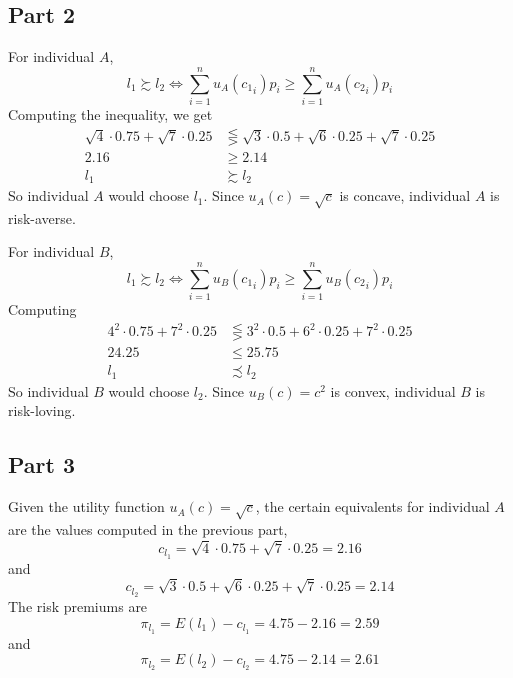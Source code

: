 \documentclass[12pt]{extarticle}
\numberwithin{table}{section}
\numberwithin{figure}{section}
\numberwithin{equation}{section}
\begin{document}
\subsection*{Part 2}
For individual $A$,
\begin{equation}
    l_1 \succsim l_2 \iff \sum_{i = 1}^n u_A({c_1}_i) p_i \ge \sum_{i = 1}^n u_A({c_2}_i) p_i
\end{equation}
Computing the inequality, we get
\begin{align}
    \sqrt{4} \cdot 0.75 + \sqrt7 \cdot 0.25 & \lesseqgtr \sqrt3 \cdot 0.5 + \sqrt6 \cdot 0.25 + \sqrt7 \cdot 0.25 \\
    2.16                                    & \ge 2.14                                                            \\
    l_1                                     & \succsim l_2
\end{align}
So individual $A$ would choose $l_1$. Since $u_A(c) = \sqrt c$ is concave, individual $A$ is risk-averse.

For individual $B$,
\begin{equation}
    l_1 \succsim l_2 \iff \sum_{i = 1}^n u_B({c_1}_i)p_i \ge \sum_{i = 1}^n u_B({c_2}_i) p_i
\end{equation}
Computing
\begin{align}
    4^2 \cdot 0.75 + 7^2 \cdot 0.25 & \lesseqgtr 3^2 \cdot 0.5 + 6^2 \cdot 0.25 + 7^2 \cdot 0.25 \\
    24.25                           & \le 25.75                                                  \\
    l_1                             & \precsim l_2
\end{align}
So individual $B$ would choose $l_2$. Since $u_B(c) = c^2$ is convex, individual $B$ is risk-loving.

\subsection*{Part 3}
Given the utility function $u_A(c) = \sqrt c$,
the certain equivalents for individual $A$ are the values computed in the previous part,
\begin{equation}
    c_{l_1} = \sqrt4 \cdot 0.75 + \sqrt7 \cdot 0.25 = 2.16
\end{equation}
and
\begin{equation}
    c_{l_2} = \sqrt3 \cdot 0.5 + \sqrt6 \cdot 0.25 + \sqrt7 \cdot 0.25 = 2.14
\end{equation}
The risk premiums are
\begin{equation}
    \pi_{l_1} = E(l_1) - c_{l_1} = 4.75 - 2.16 = 2.59
\end{equation}
and
\begin{equation}
    \pi_{l_2} = E(l_2) - c_{l_2} = 4.75 - 2.14 = 2.61
\end{equation}
\end{document}

